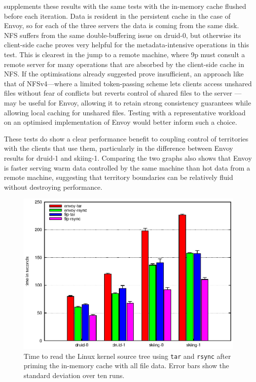  supplements these results with the same tests with the in-memory cache flushed before each iteration. Data is resident in the persistent cache in the case of Envoy, so for each of the three servers the data is coming from the same disk. NFS suffers from the same double-buffering issue on druid-0, but otherwise its client-side cache proves very helpful for the metadata-intensive operations in this test. This is clearest in the jump to a remote machine, where 9p must consult a remote server for many operations that are absorbed by the client-side cache in NFS. If the optimisations already suggested prove insufficient, an approach like that of NFSv4---where a limited token-passing scheme lets clients access unshared files without fear of conflicts but reverts control of shared files to the server \cite{shepler}---may be useful for Envoy, allowing it to retain strong consistency guarantees while allowing local caching for unshared files. Testing with a representative workload on an optimised implementation of Envoy would better inform such a choice.

These tests do show a clear performance benefit to coupling control of territories with the clients that use them, particularly in the difference between Envoy results for druid-1 and skiing-1. Comparing the two graphs also shows that Envoy is faster serving warm data controlled by the same machine than hot data from a remote machine, suggesting that territory boundaries can be relatively fluid without destroying performance.

\begin{figure}[t]
\centering
\includegraphics[width=\figwidth]{figures/arch-rsync-tar-hot}
\caption[\texttt{tar} and \texttt{rsync} benchmark results with a hot cache]{Time to read the Linux kernel source tree using \texttt{tar} and \texttt{rsync} after priming the in-memory cache with all file data. Error bars show the standard deviation over ten runs.}
\label{fig:arch-rsync-tar-hot}
\end{figure}

